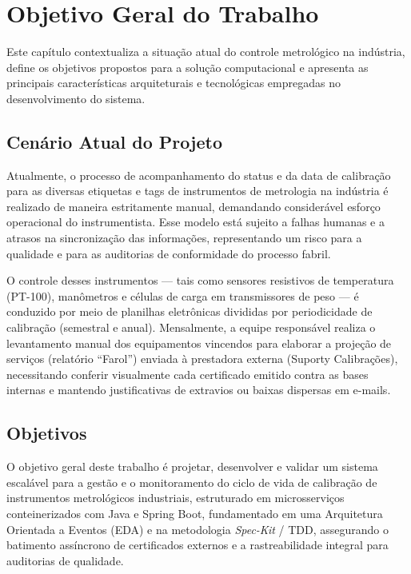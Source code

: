 \chapter{Objetivo Geral do Trabalho}

Este capítulo contextualiza a situação atual do controle metrológico na indústria, define os objetivos propostos para a solução computacional e apresenta as principais características arquiteturais e tecnológicas empregadas no desenvolvimento do sistema.

\section{Cenário Atual do Projeto}

Atualmente, o processo de acompanhamento do status e da data de calibração para as diversas etiquetas e tags de instrumentos de metrologia na indústria é realizado de maneira estritamente manual, demandando considerável esforço operacional do instrumentista. Esse modelo está sujeito a falhas humanas e a atrasos na sincronização das informações, representando um risco para a qualidade e para as auditorias de conformidade do processo fabril.

O controle desses instrumentos — tais como sensores resistivos de temperatura (PT-100), manômetros e células de carga em transmissores de peso — é conduzido por meio de planilhas eletrônicas divididas por periodicidade de calibração (semestral e anual). Mensalmente, a equipe responsável realiza o levantamento manual dos equipamentos vincendos para elaborar a projeção de serviços (relatório ``Farol'') enviada à prestadora externa (Suporty Calibrações), necessitando conferir visualmente cada certificado emitido contra as bases internas e mantendo justificativas de extravios ou baixas dispersas em e-mails.

\section{Objetivos}

O objetivo geral deste trabalho é projetar, desenvolver e validar um sistema escalável para a gestão e o monitoramento do ciclo de vida de calibração de instrumentos metrológicos industriais, estruturado em microsserviços conteinerizados com Java e Spring Boot, fundamentado em uma Arquitetura Orientada a Eventos (EDA) e na metodologia \textit{Spec-Kit} / TDD, assegurando o batimento assíncrono de certificados externos e a rastreabilidade integral para auditorias de qualidade.


